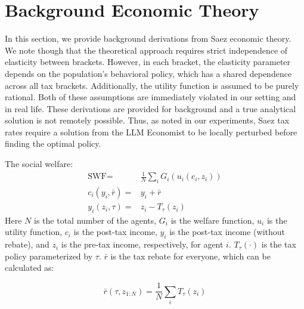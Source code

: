 

\section{Background Economic Theory}
In this section, we provide background derivations from Saez economic theory. We note though that the theoretical approach requires strict independence of elasticity between brackets. However, in each bracket, the elasticity parameter depends on the population's behavioral policy, which has a shared dependence across all tax brackets. Additionally, the utility function is assumed to be purely rational. Both of these assumptions are immediately violated in our setting and in real life. These derivations are provided for background and a true analytical solution is not remotely possible. Thus, as noted in our experiments, Saez tax rates require a solution from the LLM Economist to be locally perturbed before finding the optimal policy.

The social welfare:
\begin{align*}
\text{SWF} =& \frac{1}{N} \sum_{i} G_i(u_i(c_i, z_i))\\
c_i(y_i, \bar{r}) =& y_i + \bar{r}\\
y_i(z_i, \tau) =& z_i - T_\tau(z_i)\textbf{}
\end{align*}
Here $N$ is the total number of the agents, $G_i$ is the welfare function, $u_i$ is the utility function, $c_i$ is the post-tax income, $y_i$ is the post-tax income (without rebate), and $z_i$ is the pre-tax income, respectively, for agent $i$. $T_\tau(\cdot)$ is the tax policy parameterized by $\tau$. $\bar{r}$ is the tax rebate for everyone, which can be calculated as:

\begin{equation}
\bar{r}(\tau, z_{1:N}) = \frac{1}{N} \sum_{i} T_\tau(z_i)
\end{equation}

